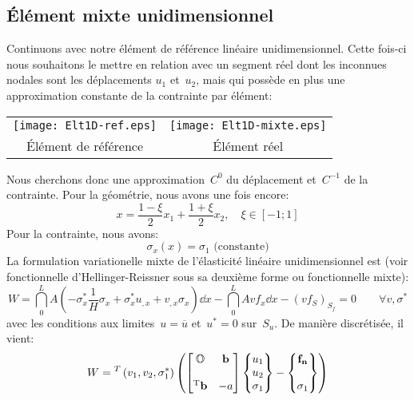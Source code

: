   \subsection{Élément mixte unidimensionnel}
\fi
Continuons avec notre élément de référence linéaire unidimensionnel. Cette fois-ci nous souhaitons
le mettre en relation avec un segment réel dont les inconnues nodales sont les déplacements
$u_1$ et~$u_2$, mais qui possède en plus une approximation constante de la contrainte
par élément:
\begin{table}[ht]
\centering
\begin{tabular}{cc}
\texttt{[image: Elt1D-ref.eps]} &
\texttt{[image: Elt1D-mixte.eps]} \\
Élément de référence & Élément réel
\end{tabular}
\end{table}
\medskipvm
Nous cherchons donc une approximation~$C^0$ du déplacement et~$C^{-1}$ de la
contrainte.
\medskipvm
Pour la géométrie, nous avons une fois encore:
\begin{equation} x=\frac{1-\xi}2 x_1 + \frac{1+\xi}2 x_2, \quad \xi\in[-1;1] \end{equation}
\medskipvm
Pour la contrainte, nous avons:
\begin{equation} \sigma_x(x)=\sigma_1 \text{ (constante)} \end{equation}
\medskipvm
La formulation variationelle mixte de l'élasticité linéaire unidimensionnel est (voir fonctionnelle
d'Hellinger-Reissner sous sa deuxième forme ou fonctionnelle mixte):
\begin{equation}
W=\dint_0^L A\left(-\sigma_x^*\frac1H\sigma_x+\sigma_x^*u_{,x}+v_{,x}\sigma_x\right) \dd x
-\dint_0^L Avf_x \dd x - (v f_S)_{S_f} = 0\qquad \forall v,\sigma^*
\end{equation}
avec les conditions aux limites~$u=\overline{u}$ et~$u^*=0$ sur~$S_u$.
\medskipvm
De manière discrétisée, il vient:
\begin{equation}
W = \LLL{v_1, v_2, \sigma_1^*}\left(
\MM*{\mO & \VV{b}\\ ~\\ \LL{b} & -a}
\VV*{u_1\\u_2\\ \sigma_1}
- \VV*{\VV{f_n}\\~\\ \sigma_1}
\right)\end{equation}
